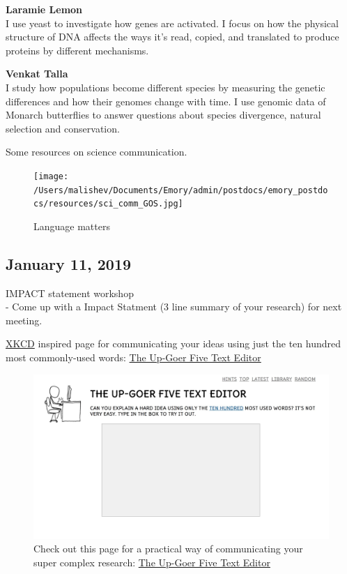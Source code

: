 \documentclass[10,portrait]{article}
\begin{document}
\textbf{Laramie Lemon}\\
I use yeast to investigate how genes are activated. I focus on how the
physical structure of DNA affects the ways it's read, copied, and
translated to produce proteins by different mechanisms.

\textbf{Venkat Talla}\\
I study how populations become different species by measuring the
genetic differences and how their genomes change with time. I use
genomic data of Monarch butterflies to answer questions about species
divergence, natural selection and conservation.

\newpage  

Some resources on science communication.

\begin{figure}
\centering
\texttt{[image: /Users/malishev/Documents/Emory/admin/postdocs/emory\_postdocs/resources/sci\_comm\_GOS.jpg]}
\caption{Language matters}
\end{figure}

\newpage    

\subsection{January 11, 2019}\label{january-11-2019}

IMPACT statement workshop\\
- Come up with a Impact Statment (3 line summary of your research) for
next meeting.

\href{https://xkcd.com/}{XKCD} inspired page for communicating your
ideas using just the ten hundred most commonly-used words:
\href{http://splasho.com/upgoer5/}{The Up-Goer Five Text Editor}

\begin{figure}
\centering
\includegraphics{upgoer5.jpeg}
\caption{Check out this page for a practical way of communicating your
super complex research: \href{http://splasho.com/upgoer5/}{The Up-Goer
Five Text Editor}}
\end{figure}
\end{document}
